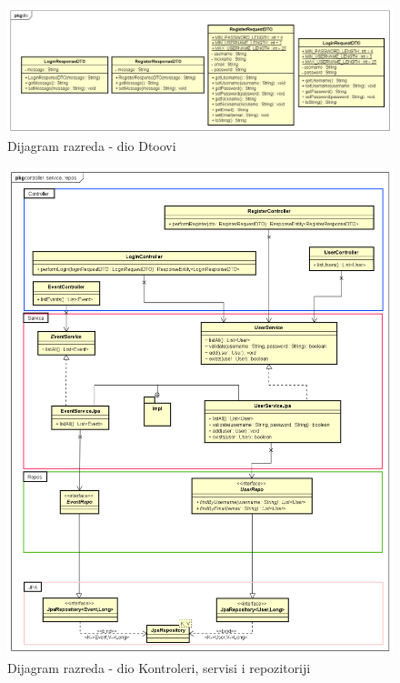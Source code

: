 			\eject
			
			
			\begin{figure}[h]
				\includegraphics[width=\textwidth]{dijagrami/UML dtoovi.png}
				\caption{Dijagram razreda - dio Dtoovi}
			\end{figure}
		
		    \begin{figure}[h]
		    	\includegraphics[width=\textwidth]{dijagrami/UML kontroleri, servisi, repozitoriji.png}
		    	\caption{Dijagram razreda - dio Kontroleri, servisi i repozitoriji}
		    \end{figure}
			
